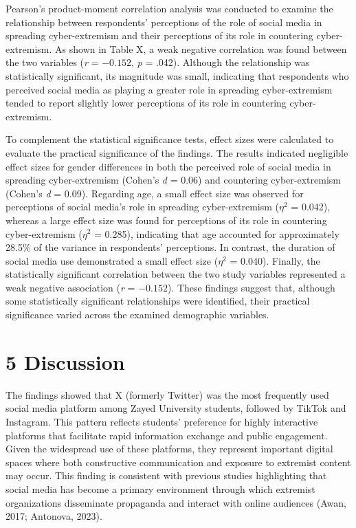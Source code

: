 \documentclass[10pt]{NSP1}
\begin{document}
	Pearson's product-moment correlation analysis was conducted to examine the relationship between respondents' perceptions of the role of social media in spreading cyber-extremism and their perceptions of its role in countering cyber-extremism. As shown in Table X, a weak negative correlation was found between the two variables (\textit{r} = $-0.152$, \textit{p} = .042). Although the relationship was statistically significant, its magnitude was small, indicating that respondents who perceived social media as playing a greater role in spreading cyber-extremism tended to report slightly lower perceptions of its role in countering cyber-extremism.
	
	To complement the statistical significance tests, effect sizes were calculated to evaluate the practical significance of the findings. The results indicated negligible effect sizes for gender differences in both the perceived role of social media in spreading cyber-extremism (Cohen's \textit{d} = 0.06) and countering cyber-extremism (Cohen's \textit{d} = 0.09). Regarding age, a small effect size was observed for perceptions of social media's role in spreading cyber-extremism ($\eta^{2}$ = 0.042), whereas a large effect size was found for perceptions of its role in countering cyber-extremism ($\eta^{2}$ = 0.285), indicating that age accounted for approximately 28.5\% of the variance in respondents' perceptions. In contrast, the duration of social media use demonstrated a small effect size ($\eta^{2}$ = 0.040). Finally, the statistically significant correlation between the two study variables represented a weak negative association (\textit{r} = $-0.152$). These findings suggest that, although some statistically significant relationships were identified, their practical significance varied across the examined demographic variables.
	
	\section*{5 Discussion}
	
	The findings showed that X (formerly Twitter) was the most frequently used social media platform among Zayed University students, followed by TikTok and Instagram. This pattern reflects students' preference for highly interactive platforms that facilitate rapid information exchange and public engagement. Given the widespread use of these platforms, they represent important digital spaces where both constructive communication and exposure to extremist content may occur. This finding is consistent with previous studies highlighting that social media has become a primary environment through which extremist organizations disseminate propaganda and interact with online audiences (Awan, 2017; Antonova, 2023).
	
\end{document}
